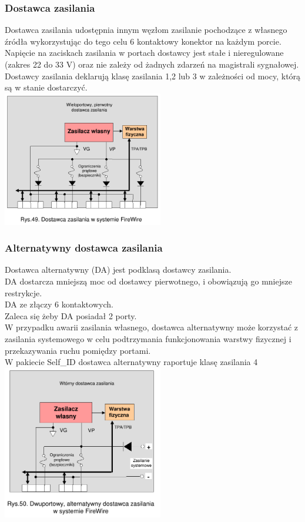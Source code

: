 \subsubsection{Dostawca zasilania}
Dostawca zasilania udostępnia innym węzłom zasilanie pochodzące z własnego źródła wykorzystując do tego celu 6 kontaktowy konektor na każdym porcie.\\
Napięcie na zaciskach zasilania w portach dostawcy jest stałe i nieregulowane (zakres 22 do 33 V) oraz nie zależy od żadnych zdarzeń na magistrali sygnałowej.\\
Dostawcy zasilania deklarują klasę zasilania 1,2 lub 3 w zależności od mocy, którą są w stanie dostarczyć.\\
\includegraphics[width=7cm]{./wyklady/FIREWIRE_66_1.pdf}
\subsubsection{Alternatywny dostawca zasilania}
Dostawca alternatywny (DA) jest podklasą dostawcy zasilania.\\
DA dostarcza mniejszą moc od dostawcy pierwotnego, i obowiązują go mniejsze restrykcje.\\
DA ze złączy 6 kontaktowych.\\
Zaleca się żeby DA posiadał 2 porty.\\
W przypadku awarii zasilania własnego, dostawca alternatywny może korzystać z zasilania systemowego w celu podtrzymania funkcjonowania warstwy fizycznej i przekazywania ruchu pomiędzy portami.\\
W pakiecie Self\_ID dostawca alternatywny raportuje klasę zasilania 4\\
\includegraphics[width=7cm]{./wyklady/FIREWIRE_67_1.pdf}

